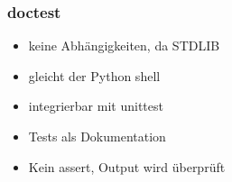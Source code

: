 \subsubsection{doctest}\label{python-tools:doctest}

\begin{itemize}
    \item keine Abhängigkeiten, da STDLIB
    \item gleicht der Python shell
    \item integrierbar mit unittest
    \item Tests als Dokumentation
    \item Kein assert, Output wird überprüft
\end{itemize}